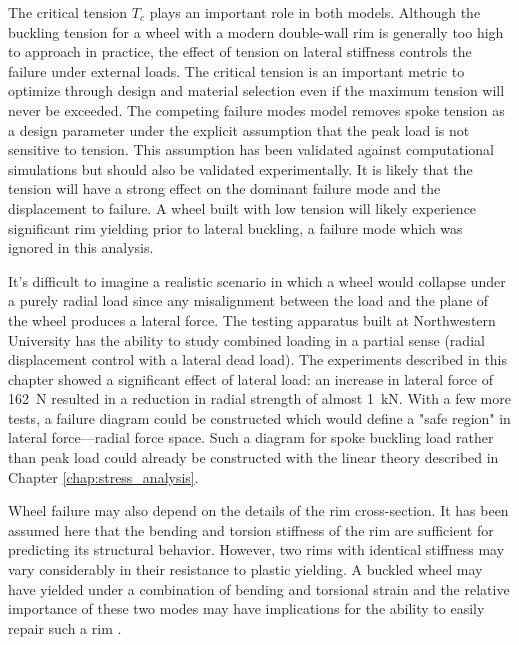 \documentclass[\rootdir/thesis.tex]{subfiles}
\begin{document}
The critical tension $T_c$ plays an important role in both models. Although the buckling tension for a wheel with a modern double-wall rim is generally too high to approach in practice, the effect of tension on lateral stiffness controls the failure under external loads. The critical tension is an important metric to optimize through design and material selection even if the maximum tension will never be exceeded. The competing failure modes model removes spoke tension as a design parameter under the explicit assumption that the peak load is not sensitive to tension. This assumption has been validated against computational simulations but should also be validated experimentally. It is likely that the tension will have a strong effect on the dominant failure mode and the displacement to failure. A wheel built with low tension will likely experience significant rim yielding prior to lateral buckling, a failure mode which was ignored in this analysis.

It's difficult to imagine a realistic scenario in which a wheel would collapse under a purely radial load since any misalignment between the load and the plane of the wheel produces a lateral force. The testing apparatus built at Northwestern University has the ability to study combined loading in a partial sense (radial displacement control with a lateral dead load). The experiments described in this chapter showed a significant effect of lateral load: an increase in lateral force of \SI{162}{N} resulted in a reduction in radial strength of almost \SI{1}{kN}. With a few more tests, a failure diagram could be constructed which would define a "safe region" in lateral force---radial force space. Such a diagram for spoke buckling load rather than peak load could already be constructed with the linear theory described in Chapter \ref{chap:stress_analysis}.

Wheel failure may also depend on the details of the rim cross-section. It has been assumed here that the bending and torsion stiffness of the rim are sufficient for predicting its structural behavior. However, two rims with identical stiffness may vary considerably in their resistance to plastic yielding. A buckled wheel may have yielded under a combination of bending and torsional strain and the relative importance of these two modes may have implications for the ability to easily repair such a rim \cite{Wilson2004}.
\end{document}
